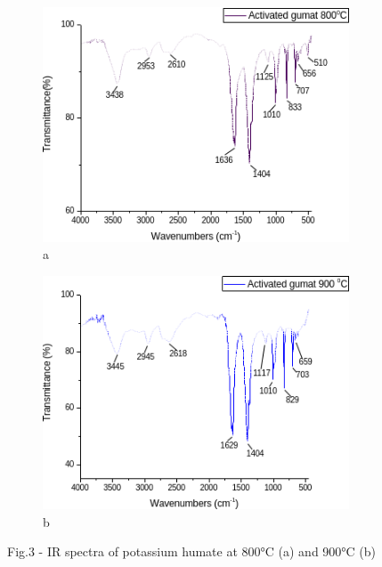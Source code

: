 \begin{figure}[H]
    \centering
    \begin{subfigure}[t]{0.45\textwidth}
        \centering
        \includegraphics[width=\textwidth]{media/chem2/image99}
        \caption*{a}
    \end{subfigure}
    \begin{subfigure}[t]{0.45\textwidth}
        \centering
        \includegraphics[width=\textwidth]{media/chem2/image100}
        \caption*{b}
    \end{subfigure}
    \caption*{Fig.3 - IR spectra of potassium humate at 800°C (a) and 900°C (b)}
\end{figure}

